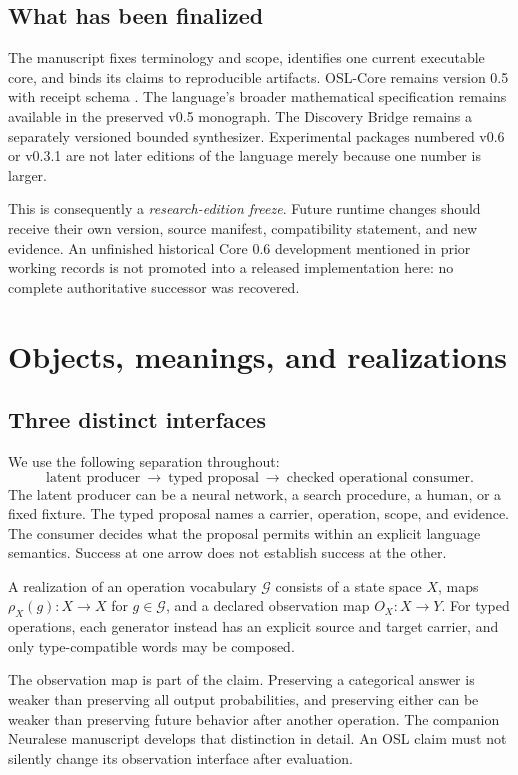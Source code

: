 \documentclass[11pt]{article}
\begin{document}
\subsection{What has been finalized}
The manuscript fixes terminology and scope, identifies one current executable core, and binds its claims to reproducible artifacts. OSL-Core remains version 0.5 with receipt schema . The language's broader mathematical specification remains available in the preserved v0.5 monograph. The Discovery Bridge remains a separately versioned bounded synthesizer. Experimental packages numbered v0.6 or v0.3.1 are not later editions of the language merely because one number is larger. \cite{o03,o05,odb}

This is consequently a \emph{research-edition freeze}. Future runtime changes should receive their own version, source manifest, compatibility statement, and new evidence. An unfinished historical Core 0.6 development mentioned in prior working records is not promoted into a released implementation here: no complete authoritative successor was recovered.

\section{Objects, meanings, and realizations}
\subsection{Three distinct interfaces}
We use the following separation throughout:
\[
\text{latent producer}\ \longrightarrow\ \text{typed proposal}\ \longrightarrow\ \text{checked operational consumer}.
\]
The latent producer can be a neural network, a search procedure, a human, or a fixed fixture. The typed proposal names a carrier, operation, scope, and evidence. The consumer decides what the proposal permits within an explicit language semantics. Success at one arrow does not establish success at the other.

\begin{definition}[Realization]
A realization of an operation vocabulary \(\mathcal G\) consists of a state space \(X\), maps \(\rho_X(g):X\to X\) for \(g\in\mathcal G\), and a declared observation map \(O_X:X\to Y\). For typed operations, each generator instead has an explicit source and target carrier, and only type-compatible words may be composed.
\end{definition}
The observation map is part of the claim. Preserving a categorical answer is weaker than preserving all output probabilities, and preserving either can be weaker than preserving future behavior after another operation. The companion Neuralese manuscript develops that distinction in detail. An OSL claim must not silently change its observation interface after evaluation.
\end{document}
